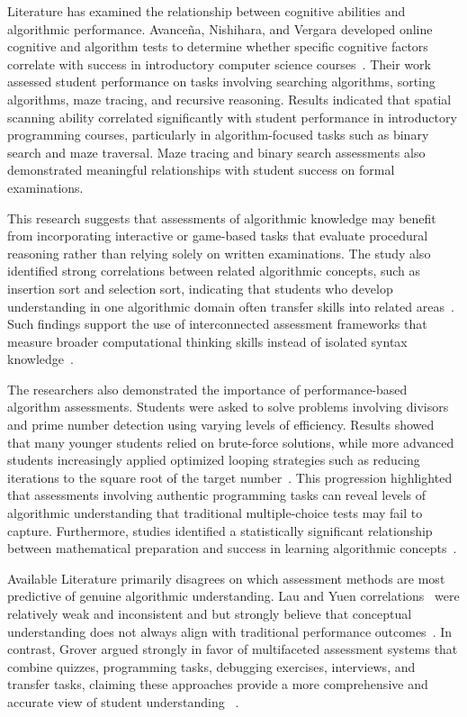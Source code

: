 Literature has examined the relationship between cognitive abilities and algorithmic performance.
Avanceña, Nishihara, and Vergara developed online cognitive and algorithm tests to determine whether specific cognitive factors correlate with
  success in introductory computer science courses~\cite{nishihara2012development}.
Their work assessed student performance on tasks involving searching algorithms, sorting algorithms, maze tracing, and recursive reasoning.
Results indicated that spatial scanning ability correlated significantly with student performance in introductory programming courses, particularly
  in algorithm-focused tasks such as binary search and maze traversal.
Maze tracing and binary search assessments also demonstrated meaningful relationships with student success on formal examinations.

This research suggests that assessments of algorithmic knowledge may benefit from incorporating interactive or game-based tasks that evaluate
  procedural reasoning rather than relying solely on written examinations.
The study also identified strong correlations between related algorithmic concepts, such as insertion sort and selection sort, indicating that
  students who develop understanding in one algorithmic domain often transfer skills into related areas~\cite{nishihara2012development}.
Such findings support the use of interconnected assessment frameworks that measure broader computational thinking skills instead of isolated syntax
  knowledge~\cite{gal2004efficiency}.

The researchers also demonstrated the importance of performance-based algorithm assessments.
Students were asked to solve problems involving divisors and prime number detection using varying levels of efficiency.
Results showed that many younger students relied on brute-force solutions, while more advanced students increasingly applied optimized looping
  strategies such as reducing iterations to the square root of the target number~\cite{nishihara2012development}.
This progression highlighted that assessments involving authentic programming tasks can reveal levels of algorithmic understanding that traditional
  multiple-choice tests may fail to capture.
Furthermore, studies identified a statistically significant relationship between mathematical preparation and success in learning algorithmic
  concepts~\cite{gal2004efficiency,nishihara2012development}.

Available Literature primarily disagrees on which assessment methods are most predictive of genuine algorithmic understanding.
Lau and Yuen correlations~\cite{lau2009} were relatively weak and inconsistent and but strongly believe that conceptual understanding does not always
  align with traditional performance outcomes~\cite{gal2004efficiency}.
In contrast, Grover argued strongly in favor of multifaceted assessment systems that combine quizzes, programming tasks, debugging exercises,
  interviews, and transfer tasks, claiming these approaches provide a more comprehensive and accurate view of student understanding
~\cite{grover2017assessing}.

